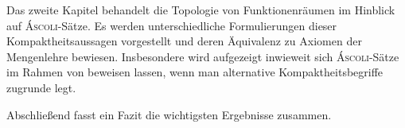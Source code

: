 Das zweite Kapitel behandelt die Topologie von Funktionenräumen im Hinblick auf \textsc{Áscoli}-Sätze.
Es werden unterschiedliche Formulierungen dieser Kompaktheitsaussagen vorgestellt und deren Äquivalenz zu Axiomen der Mengenlehre bewiesen.
Insbesondere wird aufgezeigt inwieweit sich \textsc{Áscoli}-Sätze im Rahmen von \ZF beweisen lassen, wenn man alternative Kompaktheitsbegriffe zugrunde legt.

Abschließend fasst ein Fazit die wichtigsten Ergebnisse zusammen. 

